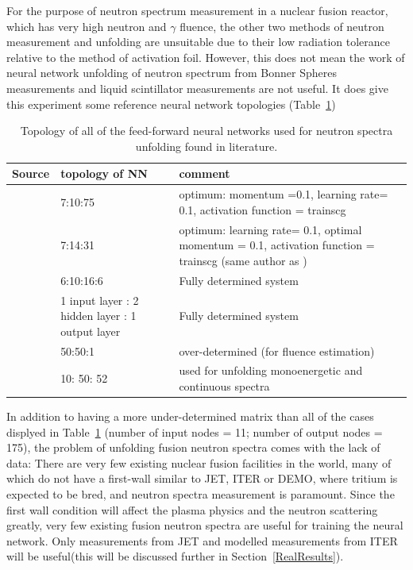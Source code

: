 \documentclass[a4paper, 12pt]{article}
\begin{document}
For the purpose of neutron spectrum measurement in a nuclear fusion reactor, which has very high neutron and $\gamma$ fluence, the other two methods of neutron measurement and unfolding are unsuitable due to their low radiation tolerance relative to the method of activation foil. However, this does not mean the work of neural network unfolding of neutron spectrum from Bonner Spheres measurements
\cite{Rodrigues-UnfoldingCompuerCodeBasedOnANN} %
\cite{RDANNM} %
\cite{ANNDoseQuantitiesPrediction} %
\cite{ClaudiaC.BonnerSphereNNUnfolding} %
and liquid scintillator measurements
\cite{ANN-ModifiedLeastSquare} %
are not useful. It does give this experiment some reference neural network topologies (Table~\ref{NNtopology})

\begin{table}
\begin{tabularx}{\textwidth}{cXX}
Source & topology of NN & comment \\
\hline
\cite{Rodrigues-UnfoldingCompuerCodeBasedOnANN} & 7:10:75 & optimum: momentum =0.1, learning rate= 0.1, activation function = trainscg\\
\cite{RDANNM} & 7:14:31 & optimum: learning rate= 0.1, optimal momentum = 0.1, activation function = trainscg (same author as \cite{Rodrigues-UnfoldingCompuerCodeBasedOnANN})\\
\cite{ANNDoseQuantitiesPrediction} & 6:10:16:6 & Fully determined system \\
\cite{ANN-ModifiedLeastSquare} & 1 input layer : 2 hidden layer : 1 output layer & Fully determined system \\
\cite{LancasterNN} & 50:50:1 & over-determined (for fluence estimation)\\
\cite{ClaudiaC.BonnerSphereNNUnfolding} & 10: 50: 52 & used for unfolding monoenergetic and continuous spectra\\
\end{tabularx}
\caption{Topology of all of the feed-forward neural networks used for neutron spectra unfolding found in literature.}\label{NNtopology}
\end{table}

In addition to having a more under-determined matrix than all of the cases displyed in Table~\ref{NNtopology} (number of input nodes = 11; number of output nodes = 175), the problem of unfolding fusion neutron spectra comes with the lack of data:
There are very few existing nuclear fusion facilities in the world, many of which do not have a first-wall similar to JET, ITER or DEMO, where tritium is expected to be bred, and neutron spectra measurement is paramount. Since the first wall condition will affect the plasma physics and the neutron scattering greatly, very few existing fusion neutron spectra are useful for training the neural network. Only measurements from JET and modelled measurements from ITER will be useful(this will be discussed further in Section~\ref{RealResults}).
\end{document}
